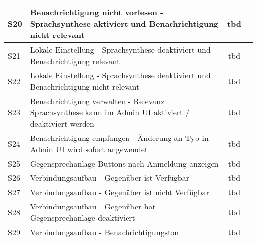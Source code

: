 \begin{table}[h]
\begin{tabular}{|l|p{11cm}|c|c|}
        \hline
        S20         & Benachrichtigung nicht vorlesen - Sprachsynthese aktiviert und Benachrichtigung nicht relevant & tbd\\
        \hline
        S21         & Lokale Einstellung - Sprachsynthese deaktiviert und Benachrichtigung relevant  & tbd\\
        \hline
        S22         & Lokale Einstellung - Sprachsynthese deaktiviert und Benachrichtigung nicht relevant  & tbd\\
        \hline
        S23         & Benachrichtigung verwalten - Relevanz Sprachsynthese kann im Admin UI aktiviert / deaktiviert werden  & tbd\\
        \hline
        S24         & Benachrichtigung empfangen - Änderung an Typ in Admin UI wird sofort angewendet   & tbd\\
        \hline
        S25         & Gegensprechanlage Buttons nach Anmeldung anzeigen & tbd\\
        \hline
        S26         & Verbindungsaufbau - Gegenüber ist Verfügbar & tbd\\
        \hline
        S27         & Verbindungsaufbau - Gegenüber ist nicht Verfügbar & tbd\\
        \hline
        S28         & Verbindungsaufbau - Gegenüber hat Gegensprechanlage deaktiviert & tbd\\
        \hline
        S29         & Verbindungsaufbau - Benachrichtigungston & tbd\\
        \hline
    \end{tabular}\label{tab:funktion_testplan_1}
\end{table}

\clearpage

